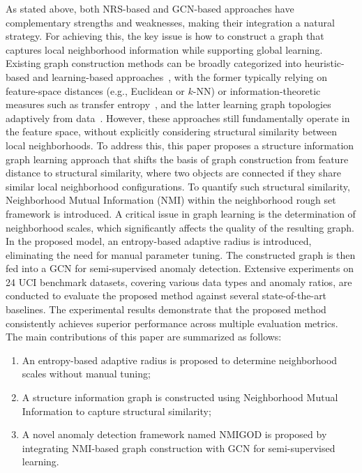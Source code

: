 \documentclass[lettersize,journal]{IEEEtran}
\begin{document}
As stated above, both NRS-based and GCN-based approaches have complementary strengths and weaknesses,
making their integration a natural strategy. For achieving this, the key issue is how to construct a graph
that captures local neighborhood information while supporting global learning. Existing graph construction
methods can be broadly categorized into heuristic-based and learning-based
approaches~\cite{Mlyahilu2025}, with the former typically relying on feature-space distances (e.g.,
Euclidean or $k$-NN) or information-theoretic measures such as transfer
entropy~\cite{Febrinanto2025}, and the latter learning graph topologies adaptively from
data~\cite{He2024,Pang2024}. However, these approaches still fundamentally operate in the feature space,
without explicitly considering structural similarity between local neighborhoods. To address this, this
paper proposes a structure information graph learning approach that shifts the basis of graph construction
from feature distance to structural similarity, where two objects are connected if they share similar
local neighborhood configurations. To quantify such structural similarity, Neighborhood Mutual Information
(NMI) within the neighborhood rough set framework is introduced. A critical issue in graph learning is
the determination of neighborhood scales, which significantly affects the quality of the resulting graph.
In the proposed model, an entropy-based adaptive radius is introduced, eliminating the need for manual
parameter tuning. The constructed graph is then fed into a GCN for semi-supervised anomaly detection.
Extensive experiments on 24 UCI benchmark datasets, covering various data types and anomaly ratios, are
conducted to evaluate the proposed method against several state-of-the-art baselines. The experimental
results demonstrate that the proposed method consistently achieves superior performance across multiple
evaluation metrics. The main contributions of this paper are summarized as follows:

\begin{enumerate}
\item An entropy-based adaptive radius is proposed to determine neighborhood scales without manual tuning;
\item A structure information graph is constructed using Neighborhood Mutual Information to capture
      structural similarity;
\item A novel anomaly detection framework named NMIGOD is proposed by integrating NMI-based graph
      construction with GCN for semi-supervised learning.
\end{enumerate}
\end{document}

